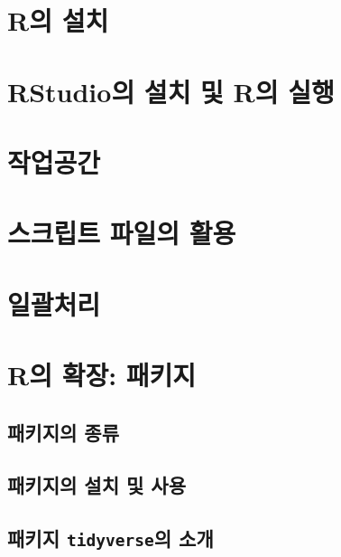 \documentclass[
]{book}
\begin{document}
\hypertarget{ruxc758-uxc124uxce58}{%
\section{R의 설치}\label{ruxc758-uxc124uxce58}}

\hypertarget{rstudiouxc758-uxc124uxce58-uxbc0f-ruxc758-uxc2e4uxd589}{%
\section{RStudio의 설치 및 R의 실행}\label{rstudiouxc758-uxc124uxce58-uxbc0f-ruxc758-uxc2e4uxd589}}

\hypertarget{uxc791uxc5c5uxacf5uxac04}{%
\section{작업공간}\label{uxc791uxc5c5uxacf5uxac04}}

\hypertarget{uxc2a4uxd06cuxb9bduxd2b8-uxd30cuxc77cuxc758-uxd65cuxc6a9}{%
\section{스크립트 파일의 활용}\label{uxc2a4uxd06cuxb9bduxd2b8-uxd30cuxc77cuxc758-uxd65cuxc6a9}}

\hypertarget{section-batch}{%
\section{일괄처리}\label{section-batch}}

\hypertarget{section-package}{%
\section{R의 확장: 패키지}\label{section-package}}

\hypertarget{uxd328uxd0a4uxc9c0uxc758-uxc885uxb958}{%
\subsection{패키지의 종류}\label{uxd328uxd0a4uxc9c0uxc758-uxc885uxb958}}

\hypertarget{uxd328uxd0a4uxc9c0uxc758-uxc124uxce58-uxbc0f-uxc0acuxc6a9}{%
\subsection{패키지의 설치 및 사용}\label{uxd328uxd0a4uxc9c0uxc758-uxc124uxce58-uxbc0f-uxc0acuxc6a9}}

\hypertarget{uxd328uxd0a4uxc9c0-tidyverseuxc758-uxc18cuxac1c}{%
\subsection{\texorpdfstring{패키지 \texttt{tidyverse}의 소개}{패키지 tidyverse의 소개}}\label{uxd328uxd0a4uxc9c0-tidyverseuxc758-uxc18cuxac1c}}
\end{document}
